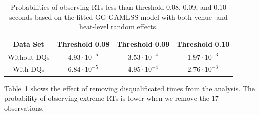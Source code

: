 \documentclass[12pt, letterpaper]{article}
\begin{document}
\begin{table}
  \centering
  \caption{Probabilities of observing RTs less than threshold 0.08,
  0.09, and 0.10 seconds based on the
    fitted GG GAMLSS model with both venue- and heat-level
random effects.}
  \begin{tabular}{c c c c}
   \toprule
   Data Set & Threshold 0.08 & Threshold 0.09 & Threshold 0.10  \\
   \midrule
   Without DQs & $4.93\cdot10^{-5}$ & $3.53\cdot10^{-4}$ &  $1.97\cdot10^{-3}$  \\
   With DQs & $6.84\cdot10^{-5}$ & $4.95\cdot10^{-4}$ & $2.76\cdot10^{-3}$ \\
   \bottomrule
  \end{tabular}
  \label{tab:DQSim_probability}
\end{table}

Table~\ref{tab:DQSim_probability} shows the effect of removing disqualificated
times from the analysis.  The probability of observing extreme RTs is lower when
we remove the 17 observations.



\end{document}
